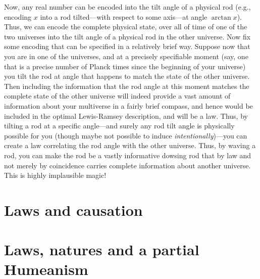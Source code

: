 Now, any real number can be encoded into the tilt angle of a physical rod (e.g., encoding $x$ into a rod tilted---with respect to some
axis---at angle $\arctan x$). Thus, we can encode the complete physical state, over all of time of one of the two universes into the tilt angle of a physical rod
in the other universe. Now fix some encoding that can be specified in a relatively brief way. Suppose now that you are in one of the 
universes, and at a precisely specifiable moment (say, one that is a precise number of Planck times since the beginning of your universe)
you tilt the rod at angle that happens to match the state of the other universe. Then including the information that the 
rod angle at this moment matches the complete state of the other universe will indeed provide a vast amount of information about your 
multiverse in a fairly brief compass, and hence would be included in the optimal Lewis-Ramsey description, and will be a law. Thus, by
tilting a rod at a specific angle---and surely any rod tilt angle is physically possible for you (though maybe not possible to induce
\textit{intentionally})---you can create a law correlating the rod angle with the other universe. Thus, by waving a rod, you can make
the rod be a vastly informative dowsing rod that by law and not merely by coincidence carries complete information about another universe.
This is highly implausible magic!

\section{Laws and causation}

\section{Laws, natures and a partial Humeanism}
\chaptertail

